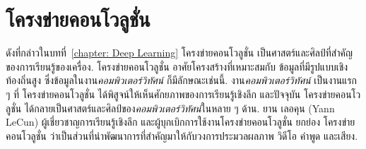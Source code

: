 \chapter{โครงข่ายคอนโวลูชั่น}
\label{chapter: Convolution}

\begin{Parallel}[c]{0.40\textwidth}{0.56\textwidth}
\end{Parallel}

\vspace{1cm}





ดังที่กล่าวในบทที่~\ref{chapter: Deep Learning}
โครงข่ายคอนโวลูชั่น เป็นศาสตร์และศิลป์ที่สำคัญของการเรียนรู้ของเครื่อง.
โครงข่ายคอนโวลูชั่น
อาศัยโครงสร้างที่เหมาะสมกับ
ข้อมูลที่มีรูปแบบเชิงท้องถิ่นสูง
ซึ่งข้อมูลในงาน\textit{คอมพิวเตอร์วิทัศน์}
ก็มีลักษณะเช่นนี้.
งาน\textit{คอมพิวเตอร์วิทัศน์}
เป็นงานแรก ๆ ที่
โครงข่ายคอนโวลูชั่น
ได้พิสูจน์ให้เห็นศักยภาพของการเรียนรู้เชิงลึก 
และปัจจุบัน
โครงข่ายคอนโวลูชั่น
ได้กลายเป็นศาสตร์และศิลป์ของ\textit{คอมพิวเตอร์วิทัศน์}ในหลาย ๆ ด้าน.
ยาน เลอคุน (Yann LeCun) ผู้เชี่ยวชาญการเรียนรู้เชิงลึก
และผู้บุกเบิกการใช้งานโครงข่ายคอนโวลูชั่น ยกย่อง\cite{LeCunEtAl2015a}
โครงข่ายคอนโวลูชั่น ว่าเป็นส่วนที่นำพัฒนาการที่สำคัญมาให้กับวงการประมวลผลภาพ วิดีโอ คำพูด และเสียง.

